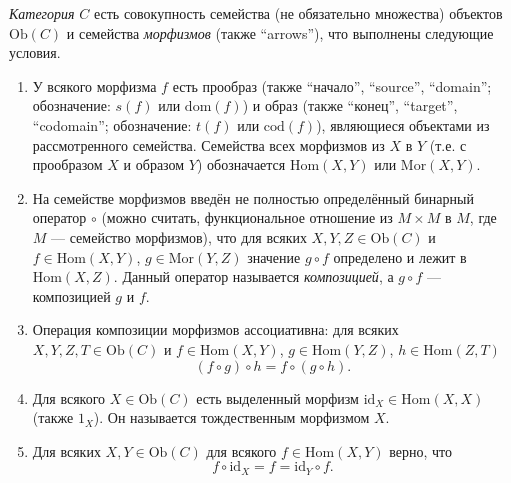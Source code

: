 \documentclass[12pt,a4paper]{article}
\newcommand{\Hom}{\mathrm{Hom}}
\newcommand{\Mor}{\mathrm{Mor}}
\newcommand{\dom}{\mathrm{dom}}
\newcommand{\cod}{\mathrm{cod}}
\newcommand{\Ob}{\mathrm{Ob}}
\newcommand{\id}{\mathrm{id}}
\begin{document}
    \begin{definition}
        \emph{Категория} $C$ есть совокупность семейства (не обязательно множества) объектов $\Ob(C)$ и семейства \emph{морфизмов} (также ``arrows''), что выполнены следующие условия.
        \begin{enumerate}
            \item У всякого морфизма $f$ есть прообраз (также ``начало'', ``source'', ``domain''; обозначение: $s(f)$ или $\dom(f)$) и образ (также ``конец'', ``target'', ``codomain''; обозначение: $t(f)$ или $\cod(f)$), являющиеся объектами из рассмотренного семейства. Семейства всех морфизмов из $X$ в $Y$ (т.е. с прообразом $X$ и образом $Y$) обозначается $\Hom(X, Y)$ или $\Mor(X, Y)$.
            \item На семействе морфизмов введён не полностью определённый бинарный оператор $\circ$ (можно считать, функциональное отношение из $M \times M$ в $M$, где $M$ --- семейство морфизмов), что для всяких $X, Y, Z \in \Ob(C)$ и $f \in \Hom(X, Y)$, $g \in \Mor(Y, Z)$ значение $g \circ f$ определено и лежит в $\Hom(X, Z)$. Данный оператор называется \emph{композицией}, а $g \circ f$ --- композицией $g$ и $f$.
            \item Операция композиции морфизмов ассоциативна: для всяких $X, Y, Z, T \in \Ob(C)$ и $f \in \Hom(X, Y)$, $g \in \Hom(Y, Z)$, $h \in \Hom(Z, T)$
                \[(f \circ g) \circ h = f \circ (g \circ h).\]
            \item Для всякого $X \in \Ob(C)$ есть выделенный морфизм $\id_X \in \Hom(X, X)$ (также $1_X$). Он называется тождественным морфизмом $X$.
            \item Для всяких $X, Y \in \Ob(C)$ для всякого $f \in \Hom(X, Y)$ верно, что
                \[f \circ \id_X = f = \id_Y \circ f.\]
        \end{enumerate}
    \end{definition}
\end{document}
